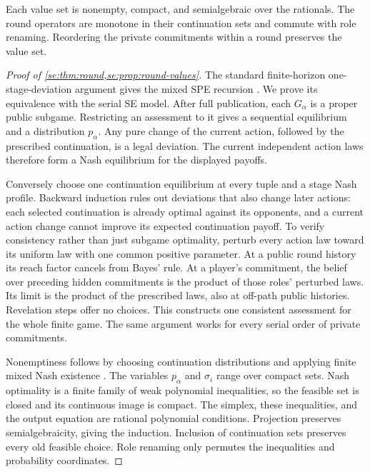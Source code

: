 \begin{proposition}\label{se:prop:round-values}
Each value set is nonempty, compact, and semialgebraic over the rationals. The round operators are monotone in their continuation sets and commute with role renaming. Reordering the private commitments within a round preserves the value set.
\end{proposition}

\begin{proof}[Proof of \cref{se:thm:round,se:prop:round-values}]
The standard finite-horizon one-stage-deviation argument gives the
mixed SPE recursion \cite{FudenbergTirole1991}. We prove its equivalence with the serial SE model.
After full publication, each $G_\alpha$ is a proper public subgame. Restricting
an assessment to it gives a sequential equilibrium and a distribution
$p_\alpha$. Any pure change of the current action, followed by the prescribed
continuation, is a legal deviation. The current independent action laws
therefore form a Nash equilibrium for the displayed payoffs.

Conversely choose one continuation equilibrium at every tuple and a
stage Nash profile. Backward induction rules out deviations that also
change later actions: each selected continuation is already optimal
against its opponents, and a current action change cannot improve its
expected continuation payoff. To verify consistency rather than just
subgame optimality, perturb every action law toward its uniform law
with one common positive parameter. At a public round history its reach
factor cancels from Bayes' rule. At a player's commitment, the belief
over preceding hidden commitments is the product of those roles'
perturbed laws. Its limit is the product of the prescribed laws, also
at off-path public histories. Revelation steps offer no choices. This
constructs one consistent assessment for the whole finite game.
The same argument works for every serial order of private commitments.

Nonemptiness follows by choosing continuation distributions and applying
finite mixed Nash existence \cite{Nash1951}. The variables $p_\alpha$ and
$\sigma_i$ range over compact sets. Nash optimality is a finite family
of weak polynomial inequalities, so the feasible set is closed and
its continuous image is compact. The simplex, these inequalities, and
the output equation are rational polynomial conditions. Projection
preserves semialgebraicity, giving the induction. Inclusion of
continuation sets preserves every old feasible choice. Role renaming
only permutes the inequalities and probability coordinates.
\end{proof}

